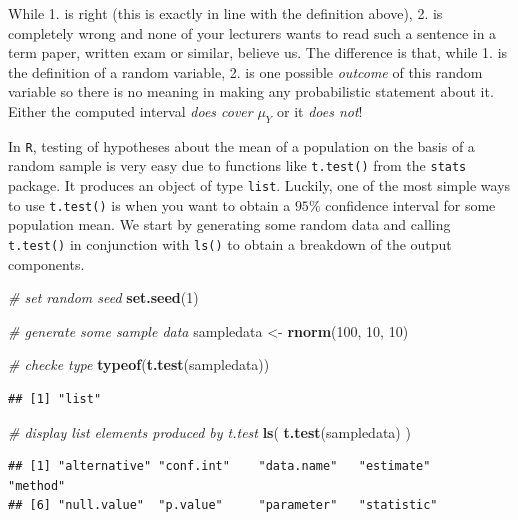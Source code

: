 \documentclass[]{book}
\newenvironment{Shaded}{\begin{snugshade}}{\end{snugshade}}
\newcommand{\KeywordTok}[1]{\textcolor[rgb]{0.13,0.29,0.53}{\textbf{#1}}}
\newcommand{\DecValTok}[1]{\textcolor[rgb]{0.00,0.00,0.81}{#1}}
\newcommand{\StringTok}[1]{\textcolor[rgb]{0.31,0.60,0.02}{#1}}
\newcommand{\CommentTok}[1]{\textcolor[rgb]{0.56,0.35,0.01}{\textit{#1}}}
\newcommand{\NormalTok}[1]{#1}
\theoremstyle{definition}
\theoremstyle{definition}
\theoremstyle{definition}
\theoremstyle{remark}
\begin{document}
While 1. is right (this is exactly in line with the definition above),
2. is completely wrong and none of your lecturers wants to read such a
sentence in a term paper, written exam or similar, believe us. The
difference is that, while 1. is the definition of a random variable, 2.
is one possible \emph{outcome} of this random variable so there is no
meaning in making any probabilistic statement about it. Either the
computed interval \emph{does cover} \(\mu_Y\) or it \emph{does not}!

In \texttt{R}, testing of hypotheses about the mean of a population on
the basis of a random sample is very easy due to functions like
\texttt{t.test()} from the \texttt{stats} package. It produces an object
of type \texttt{list}. Luckily, one of the most simple ways to use
\texttt{t.test()} is when you want to obtain a \(95\%\) confidence
interval for some population mean. We start by generating some random
data and calling \texttt{t.test()} in conjunction with \texttt{ls()} to
obtain a breakdown of the output components.

\begin{Shaded}
\begin{Highlighting}[]
\CommentTok{# set random seed}
\KeywordTok{set.seed}\NormalTok{(}\DecValTok{1}\NormalTok{)}

\CommentTok{# generate some sample data}
\NormalTok{sampledata <-}\StringTok{ }\KeywordTok{rnorm}\NormalTok{(}\DecValTok{100}\NormalTok{, }\DecValTok{10}\NormalTok{, }\DecValTok{10}\NormalTok{)}

\CommentTok{# checke type}
\KeywordTok{typeof}\NormalTok{(}\KeywordTok{t.test}\NormalTok{(sampledata))}
\end{Highlighting}
\end{Shaded}

\begin{verbatim}
## [1] "list"
\end{verbatim}

\begin{Shaded}
\begin{Highlighting}[]
\CommentTok{# display list elements produced by t.test}
\KeywordTok{ls}\NormalTok{(}
  \KeywordTok{t.test}\NormalTok{(sampledata)}
\NormalTok{)}
\end{Highlighting}
\end{Shaded}

\begin{verbatim}
## [1] "alternative" "conf.int"    "data.name"   "estimate"    "method"     
## [6] "null.value"  "p.value"     "parameter"   "statistic"
\end{verbatim}
\end{document}
